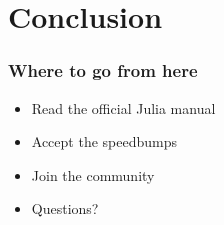 \section{Conclusion}
\frame
{
	\frametitle{Where to go from here}
  \begin{itemize}
    \item Read the official Julia manual
    \item Accept the speedbumps
    \item Join the community
    \item Questions?
  \end{itemize}
}

